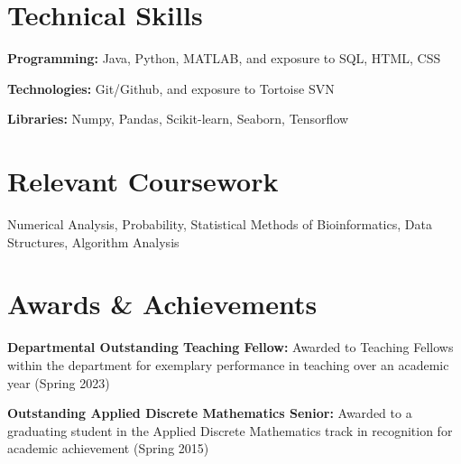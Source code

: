 \documentclass[letterpaper,11pt]{article}
\newcommand{\resumeSubHeadingListStart}{\begin{itemize}[leftmargin=0.15in, label={}] \setlength\itemsep{1em}}
\newcommand{\resumeSubHeadingListEnd}{\end{itemize}}
\begin{document}
\section{Technical Skills}
  \vspace{2pt}
  \resumeSubHeadingListStart
    \small{\item{
        \textbf{Programming:}{ Java, Python, MATLAB, and exposure to SQL, HTML, CSS } \\ \vspace{3pt}
        
        \textbf{Technologies:}{ Git/Github, and exposure to Tortoise SVN} \\ \vspace{3pt}
        
        \textbf{Libraries:}{ Numpy, Pandas, Scikit-learn, Seaborn, Tensorflow}
        
    }}
  \resumeSubHeadingListEnd




\section{Relevant Coursework}
  \vspace{2pt}
  \resumeSubHeadingListStart
    \small{\item{
        { Numerical Analysis, Probability, Statistical Methods of Bioinformatics, Data Structures, Algorithm Analysis} \\ \vspace{3pt}
    }}
  \resumeSubHeadingListEnd


\section{Awards \& Achievements}
\vspace{2pt}
\resumeSubHeadingListStart
\small{\item{
		\textbf{Departmental Outstanding Teaching Fellow: }{Awarded to Teaching Fellows within the department for exemplary performance in teaching over an academic year (Spring 2023)} \\ \vspace{3pt}
		
		\textbf{Outstanding Applied Discrete Mathematics Senior: }{ Awarded to a graduating student in the Applied Discrete Mathematics track in recognition for academic achievement (Spring 2015)} \\ \vspace{3pt}
}}
\resumeSubHeadingListEnd
\end{document}
